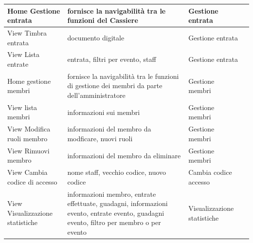 \documentclass[a4paper]{article}
\begin{document}
\begin{center}
\begin{tabularx}{1\textwidth}{|X|X|X|X|}
    \hline
    Home Gestione entrata & fornisce la navigabilità tra le funzioni del Cassiere & Gestione entrata\\
    \hline
    View Timbra entrata & documento digitale & Gestione entrata\\
    \hline
    View Lista entrate & entrata, filtri per evento, staff & Gestione entrata\\
    \hline
    Home gestione membri & fornisce la navigabilità tra le funzioni di gestione dei membri da parte dell'amministratore & Gestione membri\\
    \hline
    View lista membri & informazioni sui membri & Gestione membri\\
    \hline
    View Modifica ruoli membro & informazioni del membro da modficare, nuovi ruoli & Gestione membri\\
    \hline
    View Rimuovi membro & informazioni del membro da eliminare & Gestione membri\\
    \hline
    View Cambia codice di accesso & nome staff, vecchio codice, nuovo codice & Cambia codice accesso\\
    \hline
    View Visualizzazione statistiche & informazioni membro, entrate effettuate, guadagni, informazioni evento, entrate evento, guadagni evento, filtro per membro o per evento & Visualizzazione statistiche\\
    \hline
    \end{tabularx}
\end{center}
\end{document}
